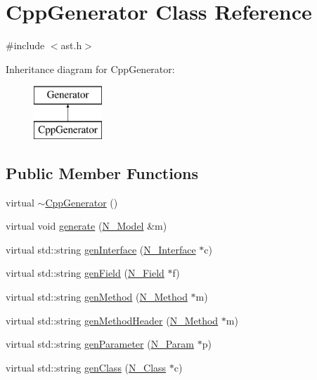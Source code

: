 \hypertarget{classCppGenerator}{}\section{Cpp\+Generator Class Reference}
\label{classCppGenerator}


{\ttfamily \#include $<$ast.\+h$>$}

Inheritance diagram for Cpp\+Generator\+:\begin{figure}[H]
\begin{center}
\leavevmode
\includegraphics[height=2.000000cm]{classCppGenerator}
\end{center}
\end{figure}
\subsection*{Public Member Functions}
\begin{DoxyCompactItemize}
\item 
virtual \hyperlink{classCppGenerator_ab81a7eddeeb169492b8885f8b39e669e}{$\sim$\+Cpp\+Generator} ()
\item 
virtual void \hyperlink{classCppGenerator_a32c3cf7f72e81b52b6937a1dcaef865d}{generate} (\hyperlink{classN__Model}{N\+\_\+\+Model} \&m)
\item 
virtual std\+::string \hyperlink{classCppGenerator_a0befaf088820c9e3b9432457f9c775db}{gen\+Interface} (\hyperlink{classN__Interface}{N\+\_\+\+Interface} $\ast$c)
\item 
virtual std\+::string \hyperlink{classCppGenerator_aedb02142a2bcdd47dc6575d317ce5408}{gen\+Field} (\hyperlink{classN__Field}{N\+\_\+\+Field} $\ast$f)
\item 
virtual std\+::string \hyperlink{classCppGenerator_a25aeb086603decc6941c8a02c52ad90e}{gen\+Method} (\hyperlink{classN__Method}{N\+\_\+\+Method} $\ast$m)
\item 
virtual std\+::string \hyperlink{classCppGenerator_ad4cf3df3310368d485dac04a41505028}{gen\+Method\+Header} (\hyperlink{classN__Method}{N\+\_\+\+Method} $\ast$m)
\item 
virtual std\+::string \hyperlink{classCppGenerator_a7a0eb0f95cb897e3f702279b3df2f47a}{gen\+Parameter} (\hyperlink{classN__Param}{N\+\_\+\+Param} $\ast$p)
\item 
virtual std\+::string \hyperlink{classCppGenerator_aff63ea51beb1daf7e6ec0c72628e9e6f}{gen\+Class} (\hyperlink{classN__Class}{N\+\_\+\+Class} $\ast$c)
\end{DoxyCompactItemize}
